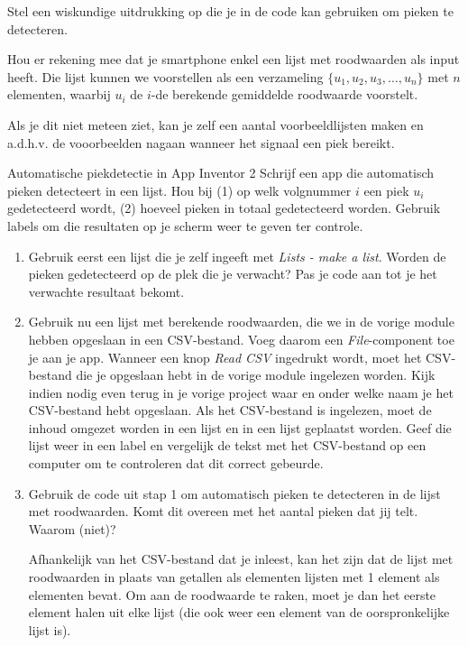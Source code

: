 \begin{oef}
	Stel een wiskundige uitdrukking op die je in de code kan gebruiken om pieken te detecteren. 
	
	Hou er rekening mee dat je smartphone enkel een lijst met roodwaarden als input heeft. Die lijst kunnen we voorstellen als een verzameling $\{ u_1, u_2, u_3, \ldots, u_n \}$ met $n$ elementen, waarbij $u_i$ de $i$-de berekende gemiddelde roodwaarde voorstelt.
	
	Als je dit niet meteen ziet, kan je zelf een aantal voorbeeldlijsten maken en a.d.h.v. de vooorbeelden nagaan wanneer het signaal een piek bereikt.
\end{oef}

\begin{opdracht}{Automatische piekdetectie in App Inventor 2}
Schrijf een app die automatisch pieken detecteert in een lijst. Hou bij (1) op welk volgnummer $i$ een piek $u_i$ gedetecteerd wordt, (2) hoeveel pieken in totaal gedetecteerd worden. Gebruik labels om die resultaten op je scherm weer te geven ter controle.

\begin{enumerate}
	\item Gebruik eerst een lijst die je zelf ingeeft met \emph{Lists - make a list}. Worden de pieken gedetecteerd op de plek die je verwacht? Pas je code aan tot je het verwachte resultaat bekomt.
	
	\item Gebruik nu een lijst met berekende roodwaarden, die we in de vorige module hebben opgeslaan in een CSV-bestand. Voeg daarom een \emph{File}-component toe je aan je app. Wanneer een knop \emph{Read CSV} ingedrukt wordt, moet het CSV-bestand die je opgeslaan hebt in de vorige module ingelezen worden. Kijk indien nodig even terug in je vorige project waar en onder welke naam je het CSV-bestand hebt opgeslaan. Als het CSV-bestand is ingelezen, moet de inhoud omgezet worden in een lijst en in een lijst geplaatst worden. Geef die lijst weer in een label en vergelijk de tekst met het CSV-bestand op een computer om te controleren dat dit correct gebeurde. 
	
	\item Gebruik de code uit stap 1 om automatisch pieken te detecteren in de lijst met roodwaarden. Komt dit overeen met het aantal pieken dat jij telt. Waarom (niet)?
	
	\begin{opmerking}
		Afhankelijk van het CSV-bestand dat je inleest, kan het zijn dat de lijst met roodwaarden in plaats van getallen als elementen lijsten met 1 element als elementen bevat. Om aan de roodwaarde te raken, moet je dan het eerste element halen uit elke lijst (die ook weer een element van de oorspronkelijke lijst is).
		

\end{opmerking}
\end{enumerate}
\end{opdracht}
